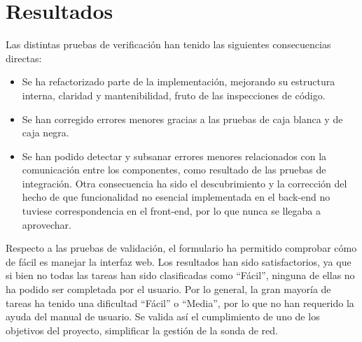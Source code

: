 \section{Resultados\label{sec:pb:resultados}}

Las distintas pruebas de verificación han tenido las siguientes consecuencias directas:
\begin{itemize}
  \item Se ha refactorizado parte de la implementación, mejorando su estructura interna, claridad y mantenibilidad, fruto de las inspecciones de código.
  \item Se han corregido errores menores gracias a las pruebas de caja blanca y de caja negra.
  \item Se han podido detectar y subsanar errores menores relacionados con la comunicación entre los componentes, como resultado de las pruebas de integración.
Otra consecuencia ha sido el descubrimiento y la corrección del hecho de que funcionalidad no esencial implementada en el \gls{back-end} no tuviese correspondencia en el \gls{front-end}, por lo que nunca se llegaba a aprovechar.
\end{itemize}

Respecto a las pruebas de validación, el formulario ha permitido comprobar cómo de fácil es manejar la interfaz web.
Los resultados han sido satisfactorios, ya que si bien no todas las tareas han sido clasificadas como ``Fácil'', ninguna de ellas no ha podido ser completada por el usuario.
Por lo general, la gran mayoría de tareas ha tenido una dificultad ``Fácil'' o ``Media'', por lo que no han requerido la ayuda del manual de usuario.
Se valida así el cumplimiento de uno de los objetivos del proyecto, simplificar la gestión de la sonda de red.
